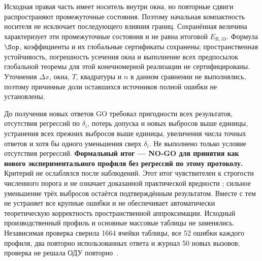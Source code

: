 Исходная правая часть имеет носитель внутри окна, но повторные сдвиги
распространяют промежуточные состояния. Поэтому начальная компактность
носителя не исключает последующего влияния границ. Сохранённая величина
 характеризует эти промежуточные
состояния и не равна итоговой $E_{\mathrm{R},33}$.
Формула $\Sop$, коэффициенты и их глобальные сертификаты сохранены;
пространственная устойчивость, погрешность усечения окна и выполнение
всех предпосылок глобальной теоремы для этой конечномерной реализации
не сертифицированы. Уточнения $\Delta x$, окна, $T$, квадратуры и $n$
в данном сравнении не выполнялись, поэтому причинные доли оставшихся
источников полной ошибки не установлены.

До получения новых ответов GO требовал пригодности всех результатов,
отсутствия регрессий по $\delta_i$, потерь допуска и новых выбросов выше
единицы, устранения всех прежних выбросов выше единицы, увеличения числа
точных ответов и хотя бы одного уменьшения сверх $\delta_i$.
Не выполнено только условие отсутствия регрессий.
\textbf{Формальный итог --- NO-GO для принятия 
как нового экспериментального профиля без регрессий по этому протоколу.}
Критерий не ослаблялся после наблюдений. Этот итог чувствителен к
строгости численного порога и не означает доказанной практической
вредности ; сильное уменьшение трёх выбросов остаётся
подтверждённым результатом. Вместе с тем  не устраняет
все крупные ошибки и не обеспечивает автоматически теоретическую
корректность пространственной аппроксимации. Исходный производственный
профиль и основные массовые таблицы не заменялись.
Независимая проверка сверила 1664 ячейки таблицы, все 52 ошибки каждого
профиля, два повторно использованных ответа и журнал
50 новых вызовов; проверка не решала ОДУ повторно~\cite{savedboundarydev}.
